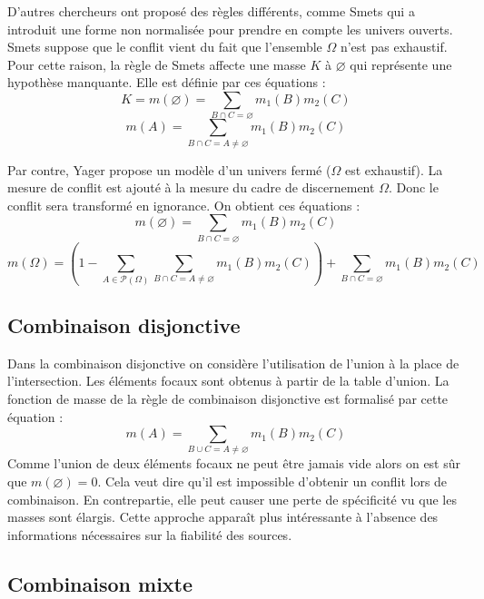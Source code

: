 D’autres chercheurs ont proposé des règles différents, comme Smets qui a introduit
une forme non normalisée pour prendre en compte les univers ouverts. Smets suppose
que le conflit vient du fait que l’ensemble $\Omega$ n’est pas exhaustif. Pour
cette raison, la règle de Smets affecte une masse $K$ à $\varnothing$ qui représente
une hypothèse manquante. Elle est définie par ces équations :
\begin{equation}
K = m(\varnothing) = \sum_{B \cap C = \varnothing} m_1(B) m_2(C)
\end{equation}
\begin{equation}
m(A) = \sum_{B \cap C = A \neq \varnothing} m_1(B) m_2(C)
\end{equation}

Par contre, Yager propose un modèle d’un univers fermé ($\Omega$ est exhaustif).
La mesure de conflit est ajouté à la mesure du cadre de discernement $\Omega$.
Donc le conflit sera transformé en ignorance. On obtient ces équations :
\begin{equation}
m(\varnothing) = \sum_{B \cap C = \varnothing} m_1(B) m_2(C)
\end{equation}
\begin{equation}
m(\Omega) = \left(1 - \sum_{A \in \mathcal{P}(\Omega)}
\sum_{B \cap C = A \neq \varnothing} m_1(B) m_2(C)\right) +
\sum_{B \cap C = \varnothing} m_1(B) m_2(C)
\end{equation}

\subsection{Combinaison disjonctive}

Dans la combinaison disjonctive on considère l’utilisation de l’union à la place
de l’intersection. Les éléments focaux sont obtenus à partir de la table d’union.
La fonction de masse de la règle de combinaison disjonctive est formalisé par
cette équation :
\begin{equation}
m(A) = \sum_{B \cup C = A \neq \varnothing} m_1(B) m_2(C)
\end{equation}
Comme l’union de deux éléments focaux ne peut être jamais vide alors on est sûr
que $m(\varnothing)=0$. Cela veut dire qu’il est impossible d’obtenir un conflit
lors de combinaison. En contrepartie, elle peut causer une perte de spécificité
vu que les masses sont élargis. Cette approche apparaît plus intéressante à
l’absence des informations nécessaires sur la fiabilité des sources.

\subsection{Combinaison mixte}

